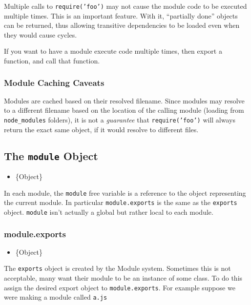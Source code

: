 Multiple calls to \texttt{require('foo')} may not cause the module code
to be executed multiple times. This is an important feature. With it,
``partially done'' objects can be returned, thus allowing transitive
dependencies to be loaded even when they would cause cycles.

If you want to have a module execute code multiple times, then export a
function, and call that function.

\subsubsection{Module Caching Caveats}

Modules are cached based on their resolved filename. Since modules may
resolve to a different filename based on the location of the calling
module (loading from \texttt{node\_modules} folders), it is not a
\emph{guarantee} that \texttt{require('foo')} will always return the
exact same object, if it would resolve to different files.

\subsection{The \texttt{module} Object}

\begin{itemize}
\item
  \{Object\}
\end{itemize}

In each module, the \texttt{module} free variable is a reference to the
object representing the current module. In particular
\texttt{module.exports} is the same as the \texttt{exports} object.
\texttt{module} isn't actually a global but rather local to each module.

\subsubsection{module.exports}

\begin{itemize}
\item
  \{Object\}
\end{itemize}

The \texttt{exports} object is created by the Module system. Sometimes
this is not acceptable, many want their module to be an instance of some
class. To do this assign the desired export object to
\texttt{module.exports}. For example suppose we were making a module
called \texttt{a.js}

